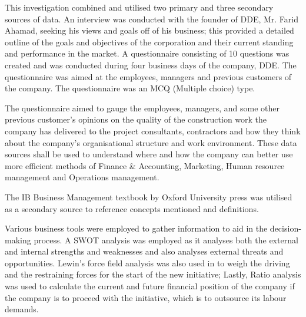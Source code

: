 {This investigation combined and utilised two primary and three secondary sources of data. An interview was conducted with the founder of DDE, Mr. Farid Ahamad, seeking his views and goals off of his business; this provided a detailed outline of the goals and objectives of the corporation and their current standing and performance in the market. A questionnaire consisting of 10 questions was created and was conducted during four business days of the company, DDE. The questionnaire was aimed at the employees, managers and previous customers of the company. The questionnaire was an MCQ (Multiple choice) type.}

{The questionnaire aimed to gauge the employees, managers, and some other previous customer's opinions on the quality of the construction work the company has delivered to the project consultants, contractors and how they think about the company's organisational structure and work environment. These data sources shall be used to understand where and how the company can better use more efficient methods of Finance & Accounting, Marketing, Human resource management and Operations management.}

{The IB Business Management textbook by Oxford University press was utilised as a secondary source to reference concepts mentioned and definitions.}

{Various business tools were employed to gather information to aid in the decision-making process. A SWOT analysis was employed as it analyses both the external and internal strengths and weaknesses and also analyses external threats and opportunities. Lewin's force field analysis was also used in to weigh the driving and the restraining forces for the start of the new initiative; Lastly, Ratio analysis was used to calculate the current and future financial position of the company if the company is to proceed with the initiative, which is to outsource its labour demands.}

